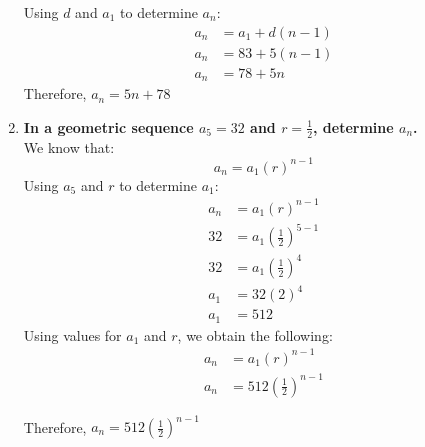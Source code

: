 \documentclass[12pt]{article}
\begin{document}
\begin{enumerate}
    Using $d$ and $a_1$ to determine $a_n$:
    \begin{align*}
        a_n & = a_1 + d(n-1) \\
        a_n & = 83 + 5(n-1) \\
        a_n & = 78 + 5n
    \end{align*} 
    Therefore, $a_n = 5n + 78$
    
    \newpage
    
    \item \textbf{In a geometric sequence $a_5 = 32$ and $r = \frac{1}{2}$, determine $a_n$.} \\
    
    We know that: 
    \begin{equation*}
        a_n = a_1(r)^{n - 1}
    \end{equation*}
    Using $a_5$ and $r$ to determine $a_1$:
    \begin{align*}
        a_n & = a_1 (r)^{n - 1} \\
        32 & = a_1(\frac{1}{2})^{5 - 1} \\
        32 & = a_1(\frac{1}{2})^4 \\
        a_1 & = 32 (2)^4 \\
        a_1 & = 512
    \end{align*}
    Using values for $a_1$ and $r$, we obtain the following:
    \begin{align*}
        a_n & = a_1(r)^{n - 1} \\
        a_n & = 512(\frac{1}{2})^{n - 1}
    \end{align*}
    
    Therefore, $a_n = 512(\frac{1}{2})^{n - 1}$
\end{enumerate}
\end{document}
